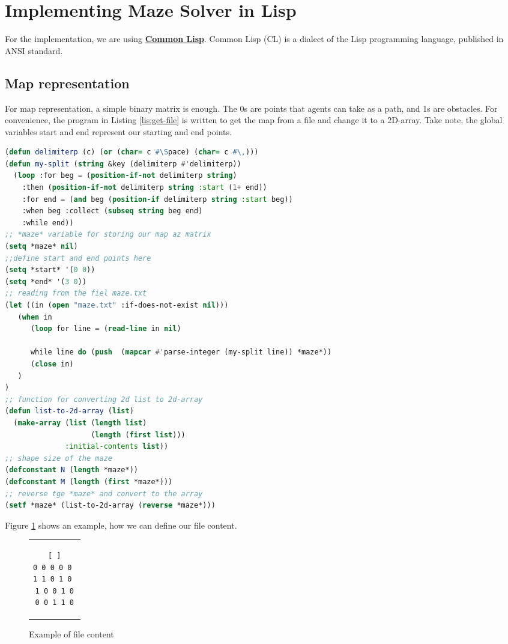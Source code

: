 \section{Implementing Maze Solver in Lisp}
For the implementation, we are using 
\href{https://en.wikipedia.org/wiki/Common_Lisp}
{\textbf{Common Lisp}}. Common Lisp (CL) is a dialect of the 
Lisp programming language, published in ANSI standard.
\subsection{Map representation}
For map representation, a simple binary matrix is 
enough. The 0s are points that agents can take as 
a path, and 1s are obstacles. For convenience, the 
program in Listing \ref{lis:get-file} is written to get the map from a file 
and change it to a 2D-array. Take note, the global variables start and end
represent our starting and end points.
\begin{lstlisting}[language=Lisp, style=mystyle,
                 caption=Getting map from a file and represent it as 2D-array,
                 label=lis:get-file]
(defun delimiterp (c) (or (char= c #\Space) (char= c #\,)))
(defun my-split (string &key (delimiterp #'delimiterp))
  (loop :for beg = (position-if-not delimiterp string)
    :then (position-if-not delimiterp string :start (1+ end))
    :for end = (and beg (position-if delimiterp string :start beg))
    :when beg :collect (subseq string beg end)
    :while end))
;; *maze* variable for storing our map az matrix
(setq *maze* nil)
;;define start and end points here
(setq *start* '(0 0))
(setq *end* '(3 0))
;; reading from the fiel maze.txt
(let ((in (open "maze.txt" :if-does-not-exist nil)))
   (when in
      (loop for line = (read-line in nil)
      
      while line do (push  (mapcar #'parse-integer (my-split line)) *maze*))
      (close in)
   )
)
;; function for converting 2d list to 2d-array
(defun list-to-2d-array (list)
  (make-array (list (length list)
                    (length (first list)))
              :initial-contents list))
;; shape size of the maze
(defconstant N (length *maze*))
(defconstant M (length (first *maze*)))
;; reverse tge *maze* and convert to the array
(setf *maze* (list-to-2d-array (reverse *maze*)))
\end{lstlisting}
Figure \ref{fig:file-content} shows an example, how we can
define our file content.
\begin{figure}[H]
\centering
\begin{tabular}{c}
    
\begin{lstlisting}[ ]
0 0 0 0 0 
1 1 0 1 0 
1 0 0 1 0
0 0 1 1 0
\end{lstlisting}
\end{tabular}    
\caption{Example of file content}
\label{fig:file-content}
\end{figure}

